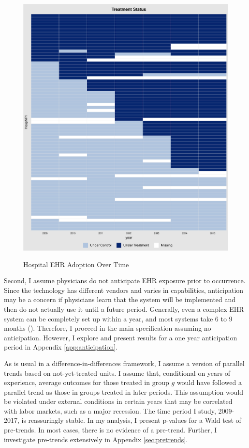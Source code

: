 \documentclass[12pt]{article}
\begin{document}
\begin{figure}[ht!]
    \centering
    \captionsetup{width=.7\linewidth}
    \caption{Hospital EHR Adoption Over Time}
    \includegraphics[scale=.5]{Objects/hosp_treat.pdf}
    \label{fig:hosp_treat}
\end{figure}

Second, I assume physicians do not anticipate EHR exposure prior to occurrence. Since the technology has different vendors and varies in capabilities, anticipation may be a concern if physicians learn that the system will be implemented and then do not actually use it until a future period. Generally, even a complex EHR system can be completely set up within a year, and most systems take 6 to 9 months (\cite{uzialko_2021}). Therefore, I proceed in the main specification assuming no anticipation. However, I explore and present results for a one year anticipation period in Appendix \ref{app:anticipation}. 

As is usual in a difference-in-differences framework, I assume a version of parallel trends based on not-yet-treated units. I assume that, conditional on years of experience, average outcomes for those treated in group $g$ would have followed a parallel trend as those in groups treated in later periods. This assumption would be violated under external conditions in certain years that may be correlated with labor markets, such as a major recession. The time period I study, 2009-2017, is reassuringly stable. In my analysis, I present p-values for a Wald test of pre-trends. In most cases, there is no evidence of a pre-trend. Further, I investigate pre-trends extensively in Appendix \ref{sec:pretrends}. 
\end{document}
